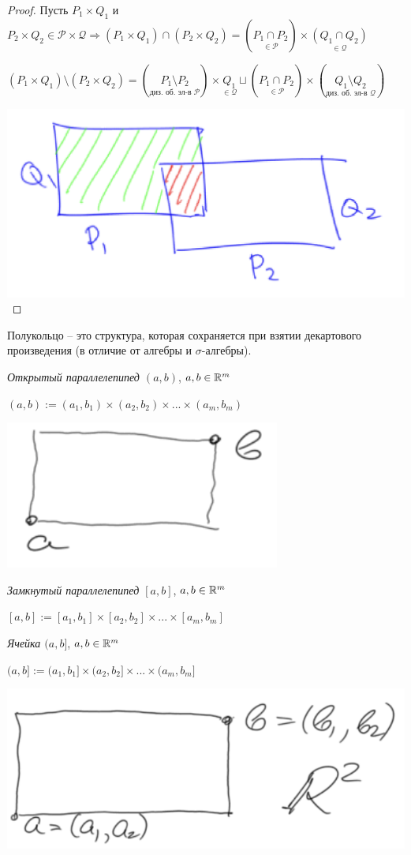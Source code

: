 \begin{proof}
    Пусть $P_1\times Q_1$ и $P_2\times Q_2\in \mathcal{P}\times \mathcal{Q}\Rightarrow (P_1\times Q_1) \cap (P_2\times Q_2)=(\underset{\in \mathcal{P}}{P_1\cap P_2})\times \underset{\in \mathcal{Q}}{(Q_1\cap Q_2)}$

    $(P_1\times Q_1) \setminus (P_2\times Q_2)= (\underset{\text{диз. об. эл-в }\mathcal{P}}{P_1 \setminus P_2}) \times \underset{\in \mathcal{Q}}{Q_1} \sqcup ( \underset{\in \mathcal{P}}{P_1\cap P_2}) \times (\underset{\text{диз. об. эл-в }\mathcal{Q}}{Q_1\setminus Q_2})$

    \includegraphics[width=0.3\linewidth]{images/23-09-07-4.png}
\end{proof}

\begin{remark}
    Полукольцо – это структура, которая сохраняется при взятии декартового произведения (в отличие 
    от алгебры и $\sigma$-алгебры).
\end{remark}

\begin{definition}
    \textit{Открытый параллелепипед $(a, b)$}, $a, b\in \mathbb{R}^m$

    $(a, b):= (a_1, b_1)\times (a_2, b_2)\times ...\times (a_m, b_m)$
\end{definition}

\includegraphics[width=0.2\linewidth]{images/23-09-07-5.png}

\begin{definition}
    \textit{Замкнутый параллелепипед $[a, b]$}, $a, b\in \mathbb{R}^m$

    $[a, b]:= [a_1, b_1]\times [a_2, b_2]\times ...\times [a_m, b_m]$
\end{definition}

\begin{definition}
    \textit{Ячейка $(a, b]$}, $a, b\in \mathbb{R}^m$

    $(a, b]:= (a_1, b_1]\times (a_2, b_2]\times ...\times (a_m, b_m]$
\end{definition}

\includegraphics[width=0.3\linewidth]{images/23-09-07-6.png}

